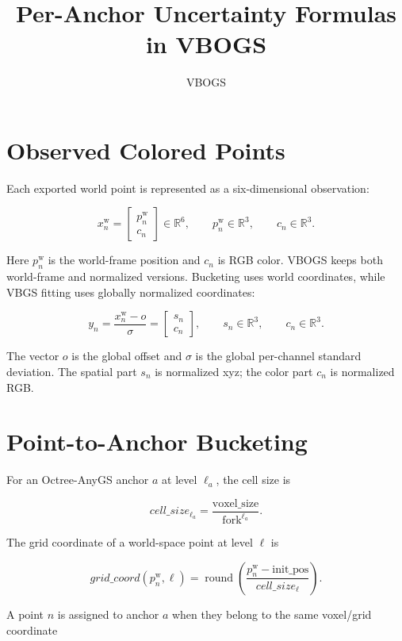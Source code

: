 \documentclass[11pt]{article}
\title{Per-Anchor Uncertainty Formulas in VBOGS}
\author{VBOGS}
\date{}
\newcommand{\R}{\mathbb{R}}
\begin{document}
\maketitle

\section{Observed Colored Points}

Each exported world point is represented as a six-dimensional observation:

\[
  x_n^{\mathrm{w}}
  =
  \begin{bmatrix}
    p_n^{\mathrm{w}} \\
    c_n
  \end{bmatrix}
  \in \R^6,
  \qquad
  p_n^{\mathrm{w}} \in \R^3,
  \qquad
  c_n \in \R^3.
\]

Here \(p_n^{\mathrm{w}}\) is the world-frame position and \(c_n\) is RGB
color. VBOGS keeps both world-frame and normalized versions. Bucketing uses
world coordinates, while VBGS fitting uses globally normalized coordinates:

\[
  y_n
  =
  \frac{x_n^{\mathrm{w}} - o}{\sigma}
  =
  \begin{bmatrix}
    s_n \\
    c_n
  \end{bmatrix},
  \qquad
  s_n \in \R^3,
  \qquad
  c_n \in \R^3.
\]

The vector \(o\) is the global offset and \(\sigma\) is the global per-channel
standard deviation. The spatial part \(s_n\) is normalized xyz; the color part
\(c_n\) is normalized RGB.

\section{Point-to-Anchor Bucketing}

For an Octree-AnyGS anchor \(a\) at level \(\ell_a\), the cell size is

\[
  cell\_size_{\ell_a}
  =
  \frac{\mathrm{voxel\_size}}{\mathrm{fork}^{\ell_a}}.
\]

The grid coordinate of a world-space point at level \(\ell\) is

\[
  grid\_coord(p_n^{\mathrm{w}},\ell)
  =
  \operatorname{round}
  \left(
    \frac{p_n^{\mathrm{w}} - \mathrm{init\_pos}}{cell\_size_\ell}
  \right).
\]

A point \(n\) is assigned to anchor \(a\) when they belong to the same voxel/grid coordinate
\end{document}
